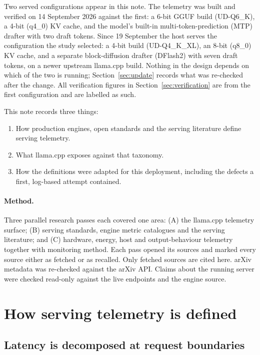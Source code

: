 \documentclass[11pt]{article}
\begin{document}
Two served configurations appear in this note. The telemetry was built and verified on 14 September
2026 against the first: a 6-bit GGUF build (UD-Q6\_K), a 4-bit (q4\_0) KV cache, and the model's
built-in multi-token-prediction (MTP) drafter with two draft tokens. Since 19 September the host
serves the configuration the study selected: a 4-bit build (UD-Q4\_K\_XL), an 8-bit (q8\_0) KV cache,
and a separate block-diffusion drafter (DFlash2) with seven draft tokens, on a newer upstream
llama.cpp build. Nothing in the design depends on which of the two is running; Section~\ref{sec:update}
records what was re-checked after the change. All verification figures in Section~\ref{sec:verification}
are from the first configuration and are labelled as such.

This note records three things:
\begin{enumerate}
\item How production engines, open standards and the serving literature define serving telemetry.
\item What llama.cpp exposes against that taxonomy.
\item How the definitions were adapted for this deployment, including the defects a first,
log-based attempt contained.
\end{enumerate}

\paragraph{Method.} Three parallel research passes each covered one area: (A) the llama.cpp
telemetry surface; (B) serving standards, engine metric catalogues and the serving literature; and
(C) hardware, energy, host and output-behaviour telemetry together with monitoring method. Each pass
opened its sources and marked every source either as fetched or as recalled. Only fetched sources
are cited here. arXiv metadata was re-checked against the arXiv API. Claims about the running
server were checked read-only against the live endpoints and the engine source.

\section{How serving telemetry is defined}

\subsection{Latency is decomposed at request boundaries}
\end{document}
